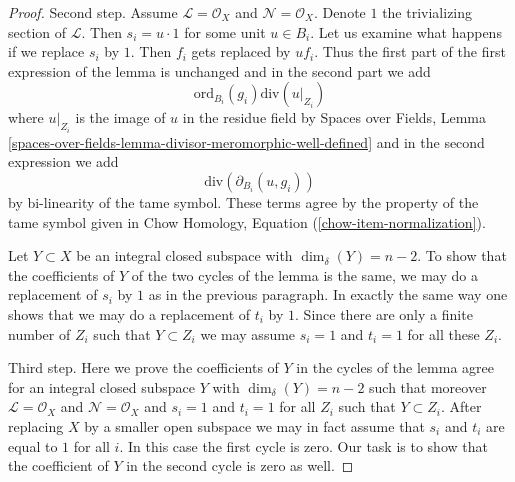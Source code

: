 \documentclass{stacks-project}
\theoremstyle{plain}
\theoremstyle{definition}
\theoremstyle{remark}
\numberwithin{equation}{subsection}
\begin{document}
\begin{proof}
\medskip\noindent
Second step. Assume $\mathcal{L} = \mathcal{O}_X$ and
$\mathcal{N} = \mathcal{O}_X$. Denote $1$ the trivializing
section of $\mathcal{L}$. Then $s_i = u \cdot 1$
for some unit $u \in B_i$. Let us examine what happens
if we replace $s_i$ by $1$. Then $f_i$ gets replaced by $u f_i$.
Thus the first part of the first expression of the lemma is unchanged
and in the second part we add
$$
\text{ord}_{B_i}(g_i)\text{div}(u|_{Z_i})
$$
where $u|_{Z_i}$ is the image of $u$ in the residue field by
Spaces over Fields, Lemma
\ref{spaces-over-fields-lemma-divisor-meromorphic-well-defined}
and in the second expression we add
$$
\text{div}(\partial_{B_i}(u, g_i))
$$
by bi-linearity of the tame symbol. These terms agree by the property
of the tame symbol given in
Chow Homology, Equation (\ref{chow-item-normalization}).

\medskip\noindent
Let $Y \subset X$ be an integral closed subspace with $\dim_\delta(Y) = n - 2$.
To show that the coefficients of $Y$ of the two cycles of the lemma
is the same, we may do a replacement of $s_i$ by $1$ as in the previous
paragraph. In exactly the same way one shows that we may do a replacement
of $t_i$ by $1$. Since there are only a finite number of $Z_i$
such that $Y \subset Z_i$ we may assume $s_i = 1$ and $t_i = 1$
for all these $Z_i$.

\medskip\noindent
Third step. Here we prove the coefficients of $Y$ in the cycles
of the lemma agree for an integral closed subspace $Y$ with
$\dim_\delta(Y) = n - 2$ such that moreover
$\mathcal{L} = \mathcal{O}_X$ and $\mathcal{N} = \mathcal{O}_X$
and $s_i = 1$ and $t_i = 1$ for all $Z_i$ such that $Y \subset Z_i$.
After replacing $X$ by a smaller open subspace we may
in fact assume that $s_i$ and $t_i$ are equal to $1$ for all $i$.
In this case the first cycle is zero. Our task is to show that
the coefficient of $Y$ in the second cycle is zero as well.


\end{proof}
\end{document}
